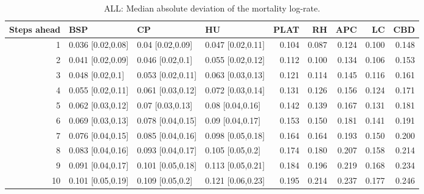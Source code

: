 % 
\begin{table}[ht]
\centering
\begin{tabular}{rlllrrrrr}
  \hline
Steps ahead & BSP & CP & HU & PLAT & RH & APC & LC & CBD \\ 
  \hline
   1 & 0.036 [0.02,0.08] & 0.04 [0.02,0.09] & 0.047 [0.02,0.11] & 0.104 & 0.087 & 0.124 & 0.100 & 0.148 \\ 
     2 & 0.041 [0.02,0.09] & 0.046 [0.02,0.1] & 0.055 [0.02,0.12] & 0.112 & 0.100 & 0.134 & 0.106 & 0.153 \\ 
     3 & 0.048 [0.02,0.1] & 0.053 [0.02,0.11] & 0.063 [0.03,0.13] & 0.121 & 0.114 & 0.145 & 0.116 & 0.161 \\ 
     4 & 0.055 [0.02,0.11] & 0.061 [0.03,0.12] & 0.072 [0.03,0.14] & 0.131 & 0.126 & 0.156 & 0.124 & 0.171 \\ 
     5 & 0.062 [0.03,0.12] & 0.07 [0.03,0.13] & 0.08 [0.04,0.16] & 0.142 & 0.139 & 0.167 & 0.131 & 0.181 \\ 
     6 & 0.069 [0.03,0.13] & 0.078 [0.04,0.15] & 0.09 [0.04,0.17] & 0.153 & 0.150 & 0.181 & 0.141 & 0.191 \\ 
     7 & 0.076 [0.04,0.15] & 0.085 [0.04,0.16] & 0.098 [0.05,0.18] & 0.164 & 0.164 & 0.193 & 0.150 & 0.200 \\ 
     8 & 0.083 [0.04,0.16] & 0.093 [0.04,0.17] & 0.105 [0.05,0.2] & 0.174 & 0.180 & 0.207 & 0.158 & 0.214 \\ 
     9 & 0.091 [0.04,0.17] & 0.101 [0.05,0.18] & 0.113 [0.05,0.21] & 0.184 & 0.196 & 0.219 & 0.168 & 0.234 \\ 
    10 & 0.101 [0.05,0.19] & 0.109 [0.05,0.2] & 0.121 [0.06,0.23] & 0.195 & 0.214 & 0.237 & 0.177 & 0.246 \\ 
   \hline
\end{tabular}
\caption{ALL: Median absolute deviation of the mortality log-rate.} 
\end{table}
